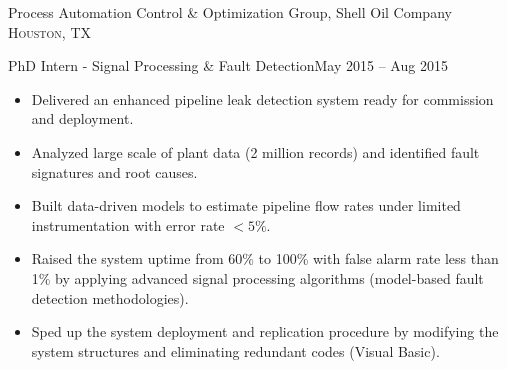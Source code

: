 \documentclass[10pt,a4paper]{article}
\begin{document}
\vspace{0.2em}
  \headedsection
  {Process Automation Control \& Optimization Group, Shell Oil Company}
  {\textsc{Houston, TX}}
  {
    \headedsubsection
    {PhD Intern - Signal Processing \& Fault Detection}{May 2015 -- Aug 2015}
    {\vspace{0.1em}
      \begin{itemize}
        \setlength{\itemsep}{0.3em}
      \item Delivered an enhanced pipeline leak detection system 
        ready for commission and deployment.
       
      \item Analyzed large scale of plant data (2 million records) and
        identified fault signatures and root causes.
       
      \item Built data-driven models to estimate pipeline flow rates under
        limited instrumentation with error rate $< 5\%$.
        
      \item Raised the system uptime from 60\% to 100\% with false alarm rate
        less than 1\% by applying advanced signal processing algorithms (model-based
        fault detection methodologies).
        
        
        
        
      \item Sped up the system deployment and replication procedure by modifying
        the system structures and eliminating redundant codes (Visual Basic).
             
        
        
      \end{itemize}
    }
  }
\end{document}
